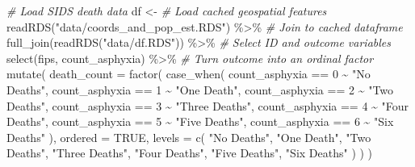 \documentclass[
]{book}
\newenvironment{Shaded}{\begin{snugshade}}{\end{snugshade}}
\newcommand{\AttributeTok}[1]{\textcolor[rgb]{0.77,0.63,0.00}{#1}}
\newcommand{\CommentTok}[1]{\textcolor[rgb]{0.56,0.35,0.01}{\textit{#1}}}
\newcommand{\ConstantTok}[1]{\textcolor[rgb]{0.00,0.00,0.00}{#1}}
\newcommand{\DecValTok}[1]{\textcolor[rgb]{0.00,0.00,0.81}{#1}}
\newcommand{\FunctionTok}[1]{\textcolor[rgb]{0.00,0.00,0.00}{#1}}
\newcommand{\NormalTok}[1]{#1}
\newcommand{\OtherTok}[1]{\textcolor[rgb]{0.56,0.35,0.01}{#1}}
\newcommand{\SpecialCharTok}[1]{\textcolor[rgb]{0.00,0.00,0.00}{#1}}
\newcommand{\StringTok}[1]{\textcolor[rgb]{0.31,0.60,0.02}{#1}}
\begin{document}
\begin{Shaded}
\begin{Highlighting}[]
\CommentTok{\# Load SIDS death data}
\NormalTok{df }\OtherTok{\textless{}{-}}
    \CommentTok{\# Load cached geospatial features}
    \FunctionTok{readRDS}\NormalTok{(}\StringTok{"data/coords\_and\_pop\_est.RDS"}\NormalTok{) }\SpecialCharTok{\%\textgreater{}\%}
    \CommentTok{\# Join to cached dataframe}
    \FunctionTok{full\_join}\NormalTok{(}\FunctionTok{readRDS}\NormalTok{(}\StringTok{"data/df.RDS"}\NormalTok{)) }\SpecialCharTok{\%\textgreater{}\%}
    \CommentTok{\# Select ID and outcome variables}
    \FunctionTok{select}\NormalTok{(fips, count\_asphyxia) }\SpecialCharTok{\%\textgreater{}\%}
    \CommentTok{\# Turn outcome into an ordinal factor}
    \FunctionTok{mutate}\NormalTok{(}
        \AttributeTok{death\_count =} \FunctionTok{factor}\NormalTok{(}
            \FunctionTok{case\_when}\NormalTok{(}
\NormalTok{                count\_asphyxia }\SpecialCharTok{==} \DecValTok{0} \SpecialCharTok{\textasciitilde{}} \StringTok{"No Deaths"}\NormalTok{,}
\NormalTok{                count\_asphyxia }\SpecialCharTok{==} \DecValTok{1} \SpecialCharTok{\textasciitilde{}} \StringTok{"One Death"}\NormalTok{,}
\NormalTok{                count\_asphyxia }\SpecialCharTok{==} \DecValTok{2} \SpecialCharTok{\textasciitilde{}} \StringTok{"Two Deaths"}\NormalTok{,}
\NormalTok{                count\_asphyxia }\SpecialCharTok{==} \DecValTok{3} \SpecialCharTok{\textasciitilde{}} \StringTok{"Three Deaths"}\NormalTok{,}
\NormalTok{                count\_asphyxia }\SpecialCharTok{==} \DecValTok{4} \SpecialCharTok{\textasciitilde{}} \StringTok{"Four Deaths"}\NormalTok{,}
\NormalTok{                count\_asphyxia }\SpecialCharTok{==} \DecValTok{5} \SpecialCharTok{\textasciitilde{}} \StringTok{"Five Deaths"}\NormalTok{,}
\NormalTok{                count\_asphyxia }\SpecialCharTok{==} \DecValTok{6} \SpecialCharTok{\textasciitilde{}} \StringTok{"Six Deaths"}
\NormalTok{            ),}
            \AttributeTok{ordered =} \ConstantTok{TRUE}\NormalTok{,}
            \AttributeTok{levels =} \FunctionTok{c}\NormalTok{(}
                \StringTok{"No Deaths"}\NormalTok{, }
                \StringTok{"One Death"}\NormalTok{, }
                \StringTok{"Two Deaths"}\NormalTok{, }
                \StringTok{"Three Deaths"}\NormalTok{, }
                \StringTok{"Four Deaths"}\NormalTok{, }
                \StringTok{"Five Deaths"}\NormalTok{, }
                \StringTok{"Six Deaths"}
\NormalTok{            )}
\NormalTok{        )}
\NormalTok{    )}


\end{Highlighting}
\end{Shaded}
\end{document}
